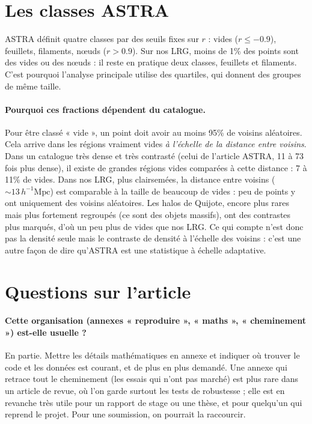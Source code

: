 \documentclass[11pt]{article}
\newcommand{\Mpch}{\,h^{-1}\mathrm{Mpc}}
\begin{document}
\section{Les classes ASTRA}

ASTRA définit quatre classes par des seuils fixes sur $r$ : vides ($r\le-0.9$), feuillets, filaments, nœuds ($r>0.9$). Sur nos LRG, moins de 1\% des points sont des vides ou des nœuds : il reste en pratique deux classes, feuillets et filaments. C'est pourquoi l'analyse principale utilise des quartiles, qui donnent des groupes de même taille.

\paragraph{Pourquoi ces fractions dépendent du catalogue.} Pour être classé « vide », un point doit avoir au moins 95\% de voisins aléatoires. Cela arrive dans les régions vraiment vides \emph{à l'échelle de la distance entre voisins}. Dans un catalogue très dense et très contrasté (celui de l'article ASTRA, 11 à 73 fois plus dense), il existe de grandes régions vides comparées à cette distance : 7 à 11\% de vides. Dans nos LRG, plus clairsemées, la distance entre voisins ($\sim13\Mpch$) est comparable à la taille de beaucoup de vides : peu de points y ont uniquement des voisins aléatoires. Les halos de Quijote, encore plus rares mais plus fortement regroupés (ce sont des objets massifs), ont des contrastes plus marqués, d'où un peu plus de vides que nos LRG. Ce qui compte n'est donc pas la densité seule mais le contraste de densité à l'échelle des voisins : c'est une autre façon de dire qu'ASTRA est une statistique à échelle adaptative.





\section{Questions sur l'article}

\paragraph{Cette organisation (annexes « reproduire », « maths », « cheminement ») est-elle usuelle ?} En partie. Mettre les détails mathématiques en annexe et indiquer où trouver le code et les données est courant, et de plus en plus demandé. Une annexe qui retrace tout le cheminement (les essais qui n'ont pas marché) est plus rare dans un article de revue, où l'on garde surtout les tests de robustesse ; elle est en revanche très utile pour un rapport de stage ou une thèse, et pour quelqu'un qui reprend le projet. Pour une soumission, on pourrait la raccourcir.
\end{document}

